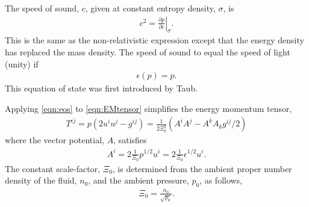 \documentclass[10pt, fleqn,final,showtrims,oldfontcommands, article,a4paper,oneside]{memoir} %
\newcommand{\eqal}[2]{\begin{align}#1\label{eqn:#2}\end{align}}
\newcommand{\eqnref}[1]{\ref{eqn:#1}}
\newcommand{\epsillon}{\epsilon}
\newcommand{\scalefactor}{\Xi_0}
\newcommand{\lr}[1]{\left( #1 \right)}
\renewcommand{\d}{\partial}
\newcommand{\given}[2]{ \left.{#1}\right|_{#2}  }
\begin{document}
The speed of sound, $c$,  given at constant entropy density, $\sigma$, is\cite{LandauBook,Taub1978} 
\begin{align}
  c^2 = \given{\frac{\d p}{\d \epsillon}}{\sigma}. \label{eqn:soundspeed}
\end{align}
This is the same as the non-relativistic expression except that the energy density has replaced the mass density.
The speed of sound to equal the speed of light (unity) if 
\eqal{
  \epsilon(p) = p.
}{eos}
This equation of state was first introduced by Taub\cite{Taub1978}.




Applying \eqnref{eos} to \eqnref{EMtensor} simplifies the energy momentum tensor,
\eqal{
  T^{i j}  = p\lr{2 u^i u^j - g^{i j}} = \frac{1}{2 \scalefactor^2} \lr{ A^i A^j - A^k A_k g^{i j}/2} 
}{EMFluid}
where the vector potential, $A$,  satisfies
\eqal{
  A^i = 2\tfrac{1}{\scalefactor}p^{1/2}u^i =2 \tfrac{1}{\scalefactor} \epsilon^{1/2} u^i.
}{defnA}
The constant scale-factor, $\scalefactor$, is determined from the ambient proper number density of the fluid, $n_0$, and the ambient pressure, $p_0$, as follows,
\begin{align}
\scalefactor = \frac{n_0}{\sqrt{p_0}}. 
\label{eqn:scalefactor}
\end{align}
\end{document}

